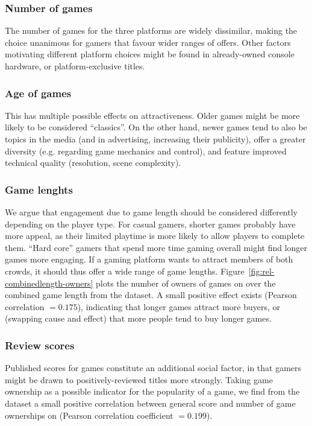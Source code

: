 \subsubsection{Number of games} The number of games for the three platforms are widely dissimilar, making the choice unanimous for gamers that favour wider ranges of offers. Other factors motivating different platform choices might be found in already-owned console hardware, or platform-exclusive titles.

\subsubsection{Age of games} This has multiple possible effects on attractiveness. Older games might be more likely to be considered ``classics''. On the other hand, newer games tend to also be topics in the media (and in advertising, increasing their publicity), offer a greater diversity (e.g. regarding game mechanics and control), %
and feature improved technical quality (resolution, scene complexity).

\subsubsection{Game lenghts} We argue that engagement due to game length should be considered differently depending on the player type. For casual gamers, shorter games probably have more appeal, as their limited playtime is more likely to allow players to complete them. ``Hard core'' gamers that spend more time gaming overall might find longer games more engaging. If a gaming platform wants to attract members of both crowds, it should thus offer a wide range of game lengths. Figure~\ref{fig:rel-combinedlength-owners} plots the number of owners of games on  \steam over the combined game length from the \hltb dataset. A small positive effect exists (Pearson correlation $= 0.175$), indicating that longer games attract more buyers, or (swapping cause and effect) that more people tend to buy longer games.

\subsubsection{Review scores} Published scores for games constitute an additional social factor, in that gamers might be drawn to positively-reviewed titles more strongly. Taking game ownership as a possible indicator for the popularity of a game, we find from the \metacritic dataset a small positive correlation between general score and number of game ownerships on \steam (Pearson correlation coefficient $= 0.199$).



